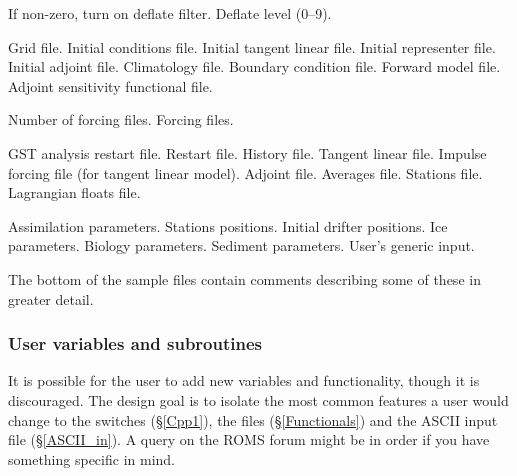 \begin{klist}
\begin{klist}
           If non-zero, turn on deflate filter.
           Deflate level (0--9).
     \end{klist}
    \mbox{}
     \begin{klist}
         Grid file.
         Initial conditions file.
         Initial tangent linear file.
         Initial representer file.
         Initial adjoint file.
         Climatology file.
         Boundary condition file.
         Forward model file.
         Adjoint sensitivity functional file.
     \end{klist}
     \mbox{}
     \begin{klist}
         Number of forcing files.
         Forcing files.
     \end{klist}
     \mbox{}
     \begin{klist}
         GST analysis restart file.
         Restart file.
         History file.
         Tangent linear file.
         Impulse forcing file (for tangent linear model).
         Adjoint file.
         Averages file.
         Stations file.
         Lagrangian floats file.
     \end{klist}
    \mbox{}
     \begin{klist}
         Assimilation parameters.
         Stations positions.
         Initial drifter positions.
         Ice parameters.
         Biology parameters.
         Sediment parameters.
         User's generic input.
     \end{klist}
\end{klist}
The bottom of the sample files contain comments describing some of these in
greater detail.


\subsubsection{User variables and subroutines}
\label{Store}
It is possible for the user to add new variables and functionality,
though it is discouraged. The design goal is to isolate the most common
features a user would change to the  switches
(\S\ref{Cpp1}), the  files (\S\ref{Functionals}) and
the ASCII input file (\S\ref{ASCII_in}). A query on the ROMS forum
might be in order if you have something specific in mind.

